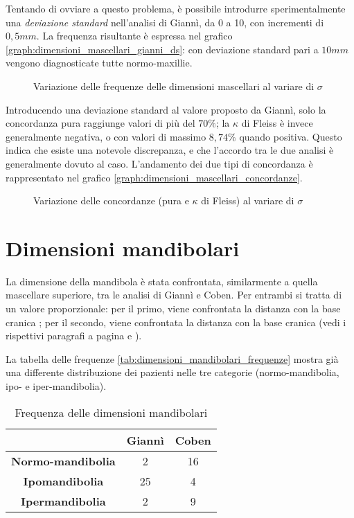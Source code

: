 Tentando di ovviare a questo problema, è possibile introdurre sperimentalmente una \emph{deviazione standard} nell'analisi di Giannì, da 0 a 10, con incrementi di $0,5 mm$. La frequenza risultante è espressa nel grafico \vref{graph:dimensioni_mascellari_gianni_ds}: con deviazione standard pari a $10 mm$ vengono diagnosticate tutte normo-maxillie.

\begin{figure}[ht!]
\centering

\caption{Variazione delle frequenze delle dimensioni mascellari al variare di $\sigma$}
\label{graph:dimensioni_mascellari_gianni_ds}
\end{figure}

Introducendo una deviazione standard al valore proposto da Giannì, solo la concordanza pura raggiunge valori di più del $70\%$; la $\kappa$ di Fleiss è invece generalmente negativa, o con valori di massimo $8,74\%$ quando positiva. Questo indica che esiste una notevole discrepanza, e che l'accordo tra le due analisi è generalmente dovuto al caso. L'andamento dei due tipi di concordanza è rappresentato nel grafico \vref{graph:dimensioni_mascellari_concordanze}.

\begin{figure}[ht!]
\centering

\caption{Variazione delle concordanze (pura e $\kappa$ di Fleiss) al variare di $\sigma$}
\label{graph:dimensioni_mascellari_concordanze}
\end{figure}

\section{Dimensioni mandibolari}
La dimensione della mandibola è stata confrontata, similarmente a quella mascellare superiore, tra le analisi di Giannì e Coben. Per entrambi si tratta di un valore proporzionale: per il primo, viene confrontata la distanza  con la base cranica ; per il secondo, viene confrontata la distanza  con la base cranica  (vedi i rispettivi paragrafi a pagina \pageref{sec:giannì_mandibola} e \pageref{sec:coben_mandibola}).

La tabella delle frequenze \vref{tab:dimensioni_mandibolari_frequenze} mostra già una differente distribuzione dei pazienti nelle tre categorie (normo-mandibolia, ipo- e iper-mandibolia).

\begin{table}[h]
\centering
\caption{Frequenza delle dimensioni mandibolari}
\label{tab:dimensioni_mandibolari_frequenze}
\begin{tabular}{>{\bfseries}ccc}
\toprule
 & \textbf{Giannì} & \textbf{Coben} \\
\midrule
Normo-mandibolia & 2 & 16 \\
Ipomandibolia & 25 & 4 \\
Ipermandibolia & 2 & 9 \\
\bottomrule
\end{tabular}
\end{table}

